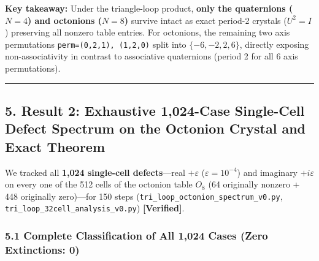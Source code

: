 \documentclass[
  a4paper,
]{article}
\begin{document}
\textbf{Key takeaway:} Under the triangle-loop product, \textbf{only the
quaternions (\(N=4\)) and octonions (\(N=8\))} survive intact as exact
period-2 crystals (\(U^2 = I\)) preserving all nonzero table entries.
For octonions, the remaining two axis permutations
\texttt{perm=(0,2,1),\ (1,2,0)} split into \(\{-6, -2, 2, 6\}\),
directly exposing non-associativity in contrast to associative
quaternions (period 2 for all 6 axis permutations).

\begin{center}\rule{0.5\linewidth}{0.5pt}\end{center}

\subsection{5. Result 2: Exhaustive 1,024-Case Single-Cell Defect
Spectrum on the Octonion Crystal and Exact
Theorem}\label{result-2-exhaustive-1024-case-single-cell-defect-spectrum-on-the-octonion-crystal-and-exact-theorem}

We tracked all \textbf{1,024 single-cell defects}---real
\(+\varepsilon\) (\(\varepsilon = 10^{-4}\)) and imaginary
\(+i\varepsilon\) on every one of the 512 cells of the octonion table
\(O_8\) (64 originally nonzero + 448 originally zero)---for 150 steps
(\texttt{tri\_\allowbreak{}loop\_\allowbreak{}octonion\_\allowbreak{}spectrum\_\allowbreak{}v0.py},
\texttt{tri\_\allowbreak{}loop\_\allowbreak{}32cell\_\allowbreak{}analysis\_\allowbreak{}v0.py}) \textbf{{[}Verified{]}}.

\subsubsection{5.1 Complete Classification of All 1,024 Cases (Zero
Extinctions:
0)}\label{complete-classification-of-all-1024-cases-zero-extinctions-0}
\end{document}
